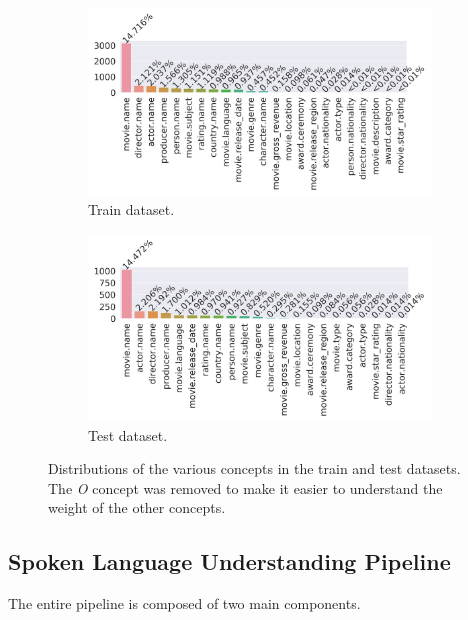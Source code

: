 \documentclass[11pt,a4paper]{article}
\begin{document}
\begin{figure}
	\begin{subfigure}[b]{0.5\linewidth}
		\includegraphics[width=\linewidth]{img/train-concepts-distribution}
		\caption{Train dataset.}
	\end{subfigure}
	\begin{subfigure}[b]{0.5\linewidth}
	\includegraphics[width=\textwidth]{img/test-concepts-distribution}
	\caption{Test dataset.}
	\end{subfigure}
	\label{fig:concept-distribution}
	\caption{Distributions of the various concepts in the train and test datasets. The \textit{O} concept was removed to make it easier to understand the weight of the other concepts.}
\end{figure}

\subsection{Spoken Language Understanding Pipeline}
The entire pipeline is composed of two main components.
\end{document}
